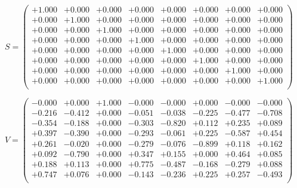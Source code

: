 \documentclass[9pt]{article}
\theoremstyle{plain}
\theoremstyle{definition}
\theoremstyle{remark}
\numberwithin{equation}{section}
\begin{document}
$S = \left(
\begin{array}{
cccccccc}
+1.000 & +0.000 & +0.000 & +0.000 & +0.000 & +0.000 & +0.000 & +0.000 \\
+0.000 & +1.000 & +0.000 & +0.000 & +0.000 & +0.000 & +0.000 & +0.000 \\
+0.000 & +0.000 & +1.000 & +0.000 & +0.000 & +0.000 & +0.000 & +0.000 \\
+0.000 & +0.000 & +0.000 & +1.000 & +0.000 & +0.000 & +0.000 & +0.000 \\
+0.000 & +0.000 & +0.000 & +0.000 & +1.000 & +0.000 & +0.000 & +0.000 \\
+0.000 & +0.000 & +0.000 & +0.000 & +0.000 & +1.000 & +0.000 & +0.000 \\
+0.000 & +0.000 & +0.000 & +0.000 & +0.000 & +0.000 & +1.000 & +0.000 \\
+0.000 & +0.000 & +0.000 & +0.000 & +0.000 & +0.000 & +0.000 & +1.000 \\
\end{array}
\right)$ \newline 

$V = \left(
\begin{array}{
cccccccc}
-0.000 & +0.000 & +1.000 & -0.000 & -0.000 & +0.000 & -0.000 & -0.000 \\
-0.216 & -0.412 & +0.000 & -0.051 & -0.038 & -0.225 & -0.477 & -0.708 \\
-0.354 & -0.188 & +0.000 & -0.303 & -0.820 & +0.112 & +0.235 & +0.089 \\
+0.397 & -0.390 & +0.000 & -0.293 & -0.061 & +0.225 & -0.587 & +0.454 \\
+0.261 & -0.020 & +0.000 & -0.279 & -0.076 & -0.899 & +0.118 & +0.162 \\
+0.092 & -0.790 & +0.000 & +0.347 & +0.155 & +0.000 & +0.464 & +0.085 \\
+0.188 & +0.113 & +0.000 & +0.775 & -0.487 & -0.168 & -0.279 & +0.088 \\
+0.747 & +0.076 & +0.000 & -0.143 & -0.236 & +0.225 & +0.257 & -0.493 \\
\end{array}
\right)$ \newline 
\end{document}
